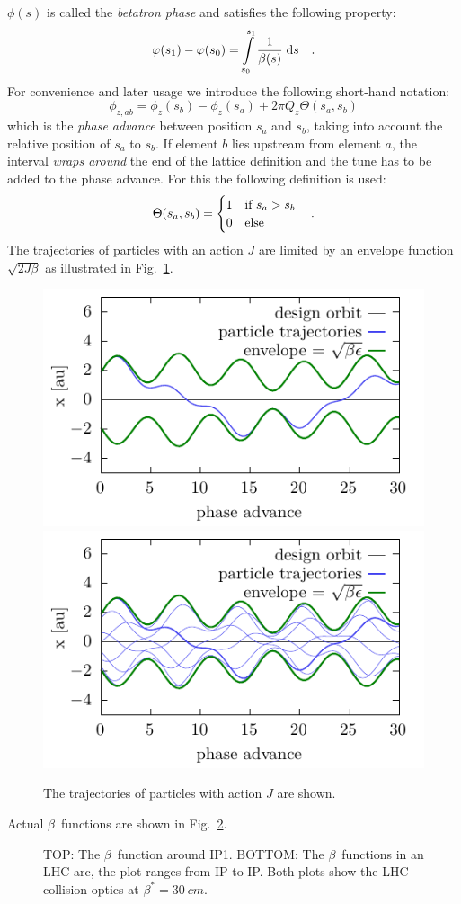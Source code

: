 $\phi(s)$ is called the \emph{betatron phase} and satisfies the following property:
%
\begin{equation}
    \varphi(s_1) - \varphi(s_0) = \int\limits_{s_0}^{s_1} \frac{1}{\beta(s)}\;\text{d} s
    \quad .
    \label{eq_phase}
\end{equation}
%
For convenience and later usage we introduce the following short-hand notation:
%
\begin{equation}
    \phi_{z,ab} = \phi_z(s_b) - \phi_z(s_a) + 2\pi Q_z \Theta(s_a, s_b)
\end{equation}
%
which is the \emph{phase advance} between position $s_a$ and $s_b$, taking into
account the relative position of $s_a$ to $s_b$.
If element $b$ lies upstream from element $a$, the interval \emph{wraps around} the end of the
lattice definition and the tune
has to be added to the phase advance. For this the following definition is used:
%
\begin{equation}
    \Theta(s_a, s_b) =
    \begin{cases}
        1 & \text{if } s_a > s_b \\
        0 & \text{else} \\
    \end{cases}
    \quad .
\end{equation}
%
The trajectories of particles with an action $J$ are limited by an envelope function $\sqrt{2J\beta}$ as illustrated in Fig.~\ref{fig_part_traj}.
%
\begin{figure}[h]
    \centering
    \includegraphics[width=.49\linewidth]{particle_traj_beta_1}
    \hfill
    \includegraphics[width=.49\linewidth]{particle_traj_beta_many_wb} 
    \caption{The trajectories of particles with action $J$ are shown.}
    \label{fig_part_traj}
\end{figure}
%
Actual $\beta$~functions are shown in Fig.~\ref{fig_beta}.
%
\begin{figure}[h]
  \centering
  \footnotesize
  
  
  \normalsize
  \caption{
    TOP: The $\beta$~function around IP1.
    BOTTOM: The $\beta$~functions in an LHC arc, the plot ranges from IP to IP.
    Both plots show the LHC collision optics at $\beta^*=\SI{30}{cm}$.
  }
  \label{fig_beta}
\end{figure}

